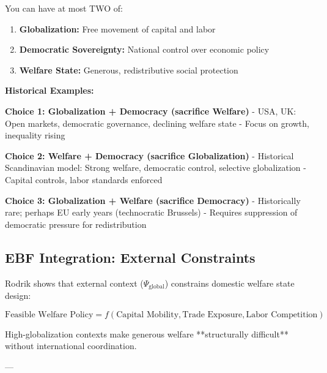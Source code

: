 \begin{tcolorbox}[colback=red!5!white, colframe=red!75!black,
    title=Rodrik's Impossible Trinity]

You can have at most TWO of:

\begin{enumerate}
\item \textbf{Globalization:} Free movement of capital and labor
\item \textbf{Democratic Sovereignty:} National control over economic policy
\item \textbf{Welfare State:} Generous, redistributive social protection
\end{enumerate}

\textbf{Historical Examples:}

\textbf{Choice 1: Globalization + Democracy (sacrifice Welfare)}
- USA, UK: Open markets, democratic governance, declining welfare state
- Focus on growth, inequality rising

\textbf{Choice 2: Welfare + Democracy (sacrifice Globalization)}
- Historical Scandinavian model: Strong welfare, democratic control, selective globalization
- Capital controls, labor standards enforced

\textbf{Choice 3: Globalization + Welfare (sacrifice Democracy)}
- Historically rare; perhaps EU early years (technocratic Brussels)
- Requires suppression of democratic pressure for redistribution

\end{tcolorbox}

\subsection{EBF Integration: External Constraints}

Rodrik shows that external context ($\Psi_{\text{global}}$) constrains domestic welfare state design:

\begin{equation}
\text{Feasible Welfare Policy} = f(\text{Capital Mobility}, \text{Trade Exposure}, \text{Labor Competition})
\end{equation}

High-globalization contexts make generous welfare **structurally difficult** without international coordination.

---

\clearpage


